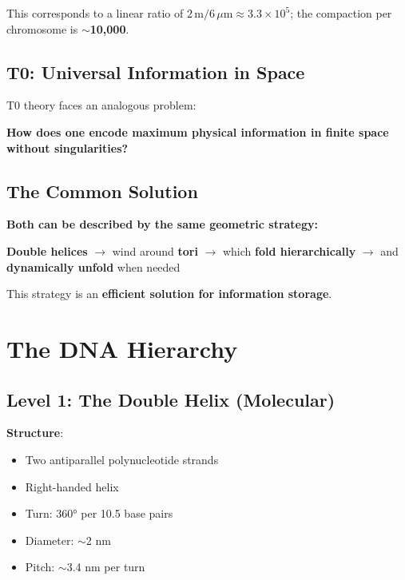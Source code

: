 	This corresponds to a linear ratio of $2\,\text{m}/6\,\mu\text{m} \approx 3.3 \times 10^5$; the compaction per chromosome is \textbf{$\sim$10,000}.

	\subsection{T0: Universal Information in Space}

	T0 theory faces an analogous problem:

	\begin{center}

		\textbf{How does one encode maximum physical information in finite space without singularities?}
	\end{center}

	\subsection{The Common Solution}

	\begin{keyresult}
		\textbf{Both can be described by the same geometric strategy:}

		\vspace{0.3cm}

		\textbf{Double helices} $\to$ wind around \textbf{tori} $\to$ which \textbf{fold hierarchically} $\to$ and \textbf{dynamically unfold} when needed

		\vspace{0.3cm}

		This strategy is an \textbf{efficient solution for information storage}.
	\end{keyresult}

	\section{The DNA Hierarchy}

	\subsection{Level 1: The Double Helix (Molecular)}

	\textbf{Structure}:
	\begin{itemize}
		\item Two antiparallel polynucleotide strands
		\item Right-handed helix
		\item Turn: 360° per 10.5 base pairs
		\item Diameter: $\sim$2 nm
		\item Pitch: $\sim$3.4 nm per turn
	\end{itemize}

